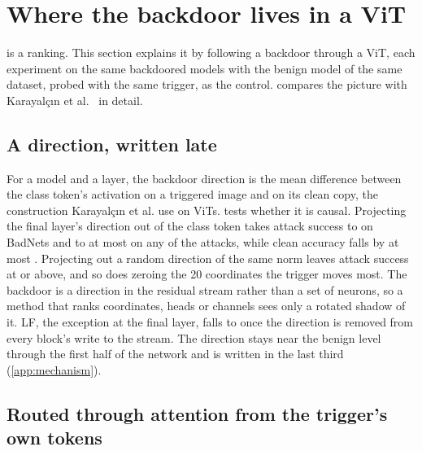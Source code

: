 \section{Where the backdoor lives in a ViT}
\label{sec:mechanism}

 is a ranking. This section explains it by following a backdoor through a ViT, each experiment on the same backdoored models with the benign model of the same dataset, probed with the same trigger, as the control.  compares the picture with Karayal\c{c}{\i}n et al.~\cite{karayalcin2026backdoor} in detail.

\subsection{A direction, written late}
\label{sec:mechanism:direction}

For a model and a layer, the backdoor direction is the mean difference between the class token's activation on a triggered image and on its clean copy, the construction Karayal\c{c}{\i}n et al. use on ViTs.  tests whether it is causal. Projecting the final layer's direction out of the class token takes attack success to \AblationDirectionMinAsr{} on BadNets and to at most \AblationDirectionMaxAsr{} on any of the \AblationCheckpoints{} attacks, while clean accuracy falls by at most \AblationCleanAccuracyCost{}. Projecting out a random direction of the same norm leaves attack success at \AblationRandomDirectionMinAsr{} or above, and so does zeroing the 20 coordinates the trigger moves most. The backdoor is a direction in the residual stream rather than a set of neurons, so a method that ranks coordinates, heads or channels sees only a rotated shadow of it. LF, the exception at the final layer, falls to \ErasureLfAsrAfterAllWritesMax{} once the direction is removed from every block's write to the stream. The direction stays near the benign level through the first half of the network and is written in the last third (\cref{app:mechanism}).



\subsection{Routed through attention from the trigger's own tokens}
\label{sec:mechanism:routing}

